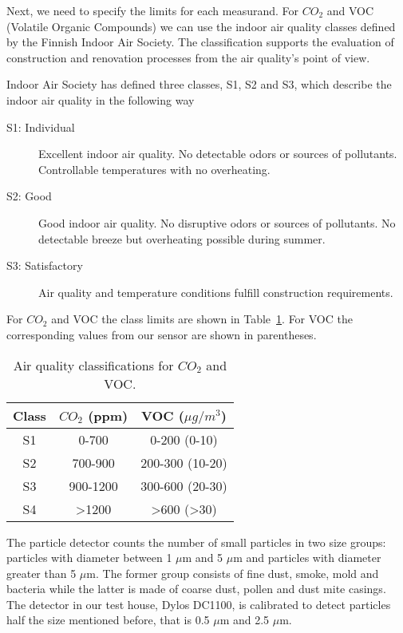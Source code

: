Next, we need to specify the limits for each measurand. For $CO_2$ and VOC (Volatile Organic Compounds) we can use the indoor air quality classes defined by the Finnish Indoor Air Society. \cite{sisailmaluokitus08} The classification supports the evaluation of construction and renovation processes from the air quality's point of view.

Indoor Air Society has defined three classes, S1, S2 and S3, which describe the indoor air quality in the following way
\begin{description}
\item[S1: Individual]{Excellent indoor air quality. No detectable odors or sources of pollutants. Controllable temperatures with no overheating.}
\item[S2: Good]{Good indoor air quality. No disruptive odors or sources of pollutants. No detectable breeze but overheating possible during summer.}
\item[S3: Satisfactory]{Air quality and temperature conditions fulfill construction requirements.}
\end{description}

For $CO_2$ and VOC the class limits are shown in Table~\ref{table:voc_co2_quality}. For VOC the corresponding values from our sensor are shown in parentheses.


\begin{table}[h!]
\begin{center}
  \caption{Air quality classifications for $CO_2$ and VOC.} 
  \begin{tabular}{c|c|c}
  	Class & $CO_2$ (ppm) & VOC ($\mu g/m^3$) \\
	\hline
	S1 & 0-700 & 0-200 (0-10) \\
	S2 & 700-900 & 200-300 (10-20) \\
	S3 & 900-1200 & 300-600 (20-30) \\
	S4 & >1200 & >600 (>30) 
  \end{tabular}
  \label{table:voc_co2_quality}
\end{center}
\end{table}

The particle detector counts the number of small particles in two size groups: particles with diameter between 1 $\mu$m and 5 $\mu$m and particles with diameter greater than 5 $\mu$m. The former group consists of fine dust, smoke, mold and bacteria while the latter is made of coarse dust, pollen and dust mite casings. The detector in our test house, Dylos DC1100, is calibrated to detect particles half the size mentioned before, that is 0.5 $\mu$m and 2.5 $\mu$m.

